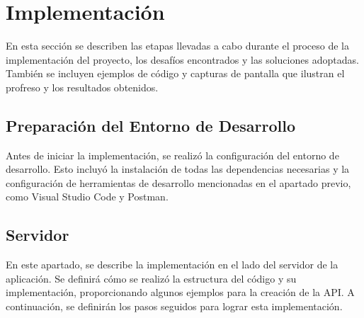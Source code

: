 \chapter{Implementación}

En esta sección se describen las etapas llevadas a cabo durante el proceso de la implementación del proyecto, los desafíos encontrados y las soluciones adoptadas. También se incluyen ejemplos de código y capturas de pantalla que ilustran el profreso y los resultados obtenidos.

\section{Preparación del Entorno de Desarrollo}

Antes de iniciar la implementación, se realizó la configuración del entorno de desarrollo. Esto incluyó la instalación de todas las dependencias necesarias y la configuración de herramientas de desarrollo mencionadas en el apartado previo, como Visual Studio Code y Postman.


\section{Servidor}

En este apartado, se describe la implementación en el lado del servidor de la aplicación. Se definirá cómo se realizó la estructura del código y su implementación, proporcionando algunos ejemplos para la creación de la API. A continuación, se definirán los pasos seguidos para lograr esta implementación.

